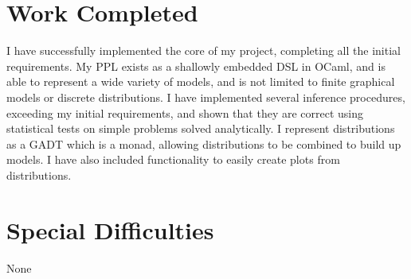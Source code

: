 \section*{Work Completed}
I have successfully implemented the core of my project, completing all the initial requirements. My PPL exists as a shallowly embedded DSL in OCaml, and is able to represent a wide variety of models, and is not limited to finite graphical models or discrete distributions. I have implemented several inference procedures, exceeding my initial requirements, and shown that they are correct using statistical tests on simple problems solved analytically. I represent distributions as a GADT which is a monad, allowing distributions to be combined to build up models. I have also included functionality to easily create plots from distributions.




\section*{Special Difficulties}
None



